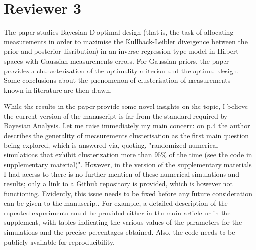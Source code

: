 \documentclass{amsart}
\begin{document}
\section{Reviewer 3}
The paper studies Bayesian D-optimal design (that is, the task of
allocating measurements in order to maximise the Kullback-Leibler
divergence between the prior and posterior disribution) in an inverse
regression type model in Hilbert spaces with Gaussian measurements
errors. For Gaussian priors, the paper provides a characterisation of
the optimality criterion and the optimal design. Some conclusions
about the phenomenon of clusterisation of measurements known in
literature are then drawn.

While the results in the paper provide some novel insights on the
topic, I believe the current version of the manuscript is far from the
standard required by Bayesian Analysis. Let me raise immediately my
main concern: on p.4 the author describes the generality of
measurements clusterisation as the first main question being explored,
which is answered via, quoting, "randomized numerical simulations that
exhibit clusterization more than 95\% of the time (see the code in
supplementary material)". However, in the version of the supplementary
materials I had access to there is no further mention of these
numerical simulations and results; only a link to a Github repository
is provided, which is however not functioning. Evidently, this issue
needs to be fixed before any future consideration can be given to the
manuscript. For example, a detailed description of the repeated
experiments could be provided either in the main article or in the
supplement, with tables indicating the various values of the
parameters for the simulations and the precise percentages
obtained. Also, the code needs to be publicly available for
reproducibility.
\end{document}
